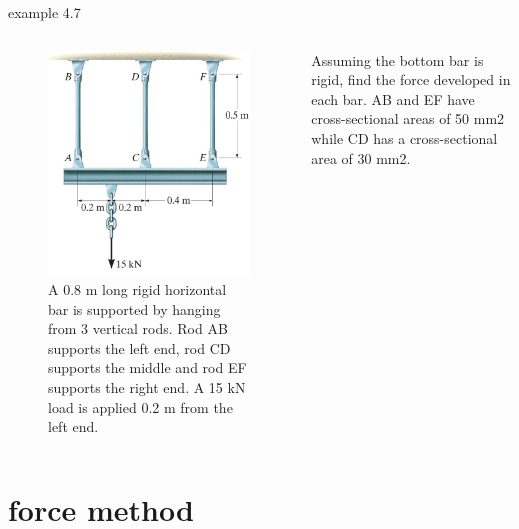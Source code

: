 \documentclass[
  letterpaper,
  ignorenonframetext,
  aspectratio=43,
  handout,
  12pt]{beamer}
\let\Oldincludegraphics\includegraphics
\renewcommand{\includegraphics}[2][]{\Oldincludegraphics[width=\textwidth,height=0.7\textheight,keepaspectratio]{#2}}
\begin{document}
\begin{frame}{example 4.7}
\protect\hypertarget{example-4.7}{}
\begin{columns}[T]
\begin{column}{0.5\textwidth}
\begin{figure}
\centering
\includegraphics{../images/example-4-7.jpg}
\caption{A 0.8 m long rigid horizontal bar is supported by hanging from
3 vertical rods. Rod AB supports the left end, rod CD supports the
middle and rod EF supports the right end. A 15 kN load is applied 0.2 m
from the left end.}
\end{figure}
\end{column}

\begin{column}{0.5\textwidth}
Assuming the bottom bar is rigid, find the force developed in each bar.
AB and EF have cross-sectional areas of 50 mm2 while CD has a
cross-sectional area of 30 mm2.
\end{column}
\end{columns}
\end{frame}

\hypertarget{force-method}{%
\section{force method}\label{force-method}}
\end{document}
